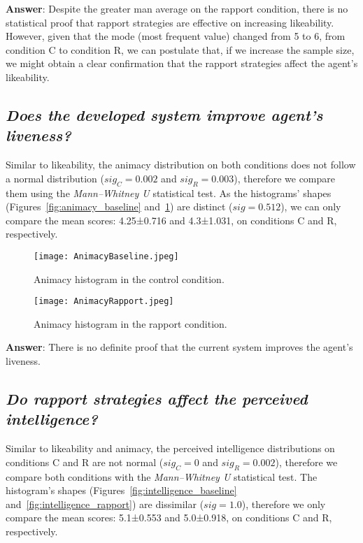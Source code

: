 \textbf{Answer}: Despite the greater man average on the rapport condition, there is no statistical proof that rapport strategies are effective on increasing likeability. However, given that the mode (most frequent value) changed from 5 to 6, from condition C to condition R, we can postulate that, if we increase the sample size, we might obtain a clear confirmation that the rapport strategies affect the agent's likeability.


\subsection*{\textbf{\textit{Does the developed system improve agent's liveness?}}}

Similar to likeability, the animacy distribution on both conditions does not follow a normal distribution ($sig_C=0.002$ and $sig_R=0.003$), therefore we compare them using the \textit{Mann–Whitney U} statistical test. As the histograms' shapes (Figures~\ref{fig:animacy_baseline} and~\ref{fig:animacy_rapport}) are distinct ($sig=0.512$), we can only compare the mean scores: 4.25±0.716 and 4.3±1.031, on conditions C and R, respectively.

\begin{figure}[ht]
	\centering
	\begin{minipage}[b]{.2\textwidth}
		\centering
		\texttt{[image: AnimacyBaseline.jpeg]}
		\caption{Animacy histogram in the control condition.}
		\label{fig:animacy_baseline}
	\end{minipage}
	\hspace{2mm}
	\begin{minipage}[b]{.2\textwidth}
		\centering
		\texttt{[image: AnimacyRapport.jpeg]}
		\caption{Animacy histogram in the rapport condition.}
		\label{fig:animacy_rapport}
	\end{minipage}
\end{figure}

\textbf{Answer}: There is no definite proof that the current system improves the agent's liveness.

\subsection*{\textbf{\textit{Do rapport strategies affect the perceived intelligence?}}}

Similar to likeability and animacy, the perceived intelligence distributions on  conditions C and R are not normal ($sig_C=0$ and $sig_R=0.002$), therefore we compare both conditions with the \textit{Mann–Whitney U} statistical test. The histogram's shapes (Figures~\ref{fig:intelligence_baseline} and~\ref{fig:intelligence_rapport}) are dissimilar ($sig=1.0$), therefore we only compare the mean scores: 5.1±0.553 and 5.0±0.918, on conditions C and R, respectively.

